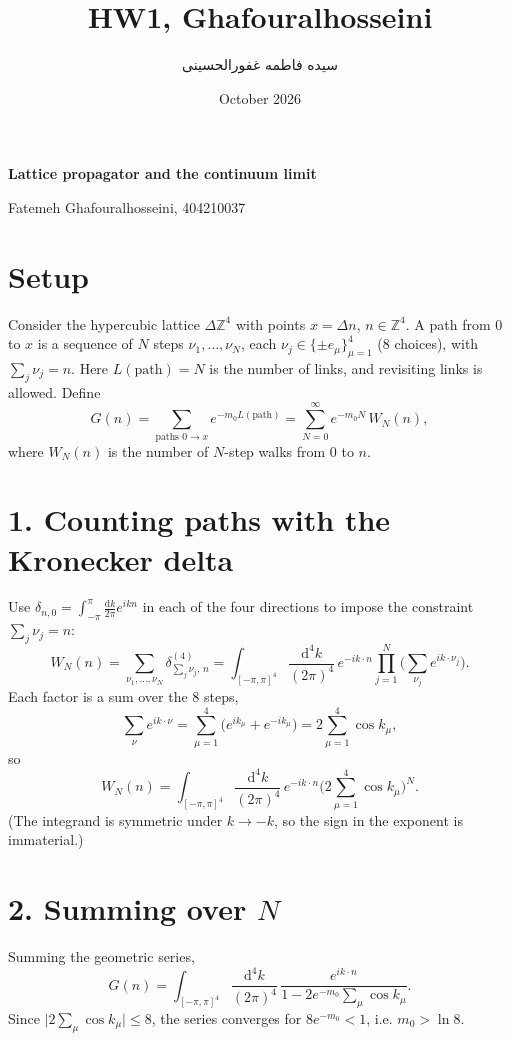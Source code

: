 \documentclass[11pt]{article}
\title{HW1, Ghafouralhosseini}
\author{سیده فاطمه غفورالحسینی}
\date{October 2026}
\newcommand{\dd}{\mathrm{d}}
\begin{document}
\begin{center}
{\Large\bfseries Lattice propagator and the continuum limit}
\end{center}
Fatemeh Ghafouralhosseini, 404210037
\section*{Setup}

Consider the hypercubic lattice $\Delta\mathbb{Z}^4$ with points $x=\Delta n$, $n\in\mathbb{Z}^4$.
A path from $0$ to $x$ is a sequence of $N$ steps $\nu_1,\dots,\nu_N$, each
$\nu_j\in\{\pm e_\mu\}_{\mu=1}^4$ (8 choices), with $\sum_j\nu_j=n$. Here $L(\text{path})=N$ is the
number of links, and revisiting links is allowed. Define
\begin{equation}
G(n)=\sum_{\text{paths }0\to x}e^{-m_0L(\text{path})}
=\sum_{N=0}^{\infty}e^{-m_0N}\,W_N(n),
\end{equation}
where $W_N(n)$ is the number of $N$-step walks from $0$ to $n$.

\section*{1. Counting paths with the Kronecker delta}

Use $\delta_{n,0}=\int_{-\pi}^{\pi}\frac{\dd k}{2\pi}e^{ikn}$ in each of the four directions to impose
the constraint $\sum_j\nu_j=n$:
\begin{equation}
W_N(n)=\sum_{\nu_1,\dots,\nu_N}\delta^{(4)}_{\sum_j\nu_j,\,n}
=\int_{[-\pi,\pi]^4}\frac{\dd^4k}{(2\pi)^4}\,e^{-ik\cdot n}
\prod_{j=1}^{N}\Big(\sum_{\nu_j}e^{ik\cdot\nu_j}\Big).
\end{equation}
Each factor is a sum over the 8 steps,
\begin{equation}
\sum_{\nu}e^{ik\cdot\nu}=\sum_{\mu=1}^{4}\big(e^{ik_\mu}+e^{-ik_\mu}\big)=2\sum_{\mu=1}^{4}\cos k_\mu ,
\end{equation}
so
\begin{equation}
W_N(n)=\int_{[-\pi,\pi]^4}\frac{\dd^4k}{(2\pi)^4}\,e^{-ik\cdot n}\Big(2\sum_{\mu=1}^4\cos k_\mu\Big)^{N}.
\end{equation}
(The integrand is symmetric under $k\to-k$, so the sign in the exponent is immaterial.)

\section*{2. Summing over $N$}

Summing the geometric series,
\begin{equation}
G(n)=\int_{[-\pi,\pi]^4}\frac{\dd^4k}{(2\pi)^4}\,
\frac{e^{ik\cdot n}}{1-2e^{-m_0}\sum_{\mu}\cos k_\mu}.
\label{eq:G}
\end{equation}
Since $\big|2\sum_\mu\cos k_\mu\big|\le 8$, the series converges for $8e^{-m_0}<1$, i.e.
$m_0>\ln 8$.
\end{document}
